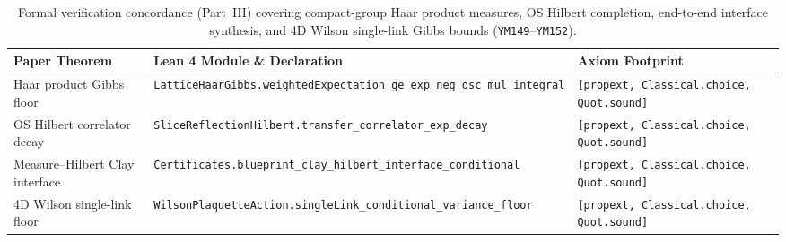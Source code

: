 \documentclass[11pt,a4paper]{article}
\begin{document}
\begin{table}[ht]
\centering
\scriptsize
\begin{tabular}{@{}p{4.3cm}p{6.6cm}p{3.4cm}@{}}
\toprule
Paper Theorem & Lean 4 Module \& Declaration & Axiom Footprint \\
\midrule
Haar product Gibbs floor & \texttt{LatticeHaarGibbs.}\newline\texttt{weightedExpectation\_ge\_exp\_neg\_osc\_mul\_integral} & \texttt{[propext, Classical.choice,} \texttt{Quot.sound]} \\
OS Hilbert correlator decay & \texttt{SliceReflectionHilbert.}\newline\texttt{transfer\_correlator\_exp\_decay} & \texttt{[propext, Classical.choice,} \texttt{Quot.sound]} \\
Measure--Hilbert Clay interface & \texttt{Certificates.}\newline\texttt{blueprint\_clay\_hilbert\_interface\_conditional} & \texttt{[propext, Classical.choice,} \texttt{Quot.sound]} \\
4D Wilson single-link floor & \texttt{WilsonPlaquetteAction.}\newline\texttt{singleLink\_conditional\_variance\_floor} & \texttt{[propext, Classical.choice,} \texttt{Quot.sound]} \\
\bottomrule
\end{tabular}
\caption{Formal verification concordance (Part~III) covering compact-group Haar product measures, OS Hilbert completion, end-to-end interface synthesis, and 4D Wilson single-link Gibbs bounds (\texttt{YM149}--\texttt{YM152}).}
\label{tab:paper4-concordance-meas}
\end{table}
\end{document}
